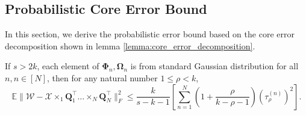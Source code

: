 \subsection{Probabilistic Core Error Bound}
In this section, we derive the probabilistic error bound based on the core error decomposition shown in lemma \ref{lemma:core_error_decomposition}. 
\begin{lem}
\label{lemma:err_core_sketch}
If $s>2k$, each element of $\mathbf{\Phi}_n, \mathbf{\Omega}_n$ is from standard Gaussian distribution for all $n, n\in [N]$, then for any natural number $1\le \rho<k$, 
\begin{equation}
\mathbb{E} \|\mathscr{W} - \mathscr{X}\times_1 \mathbf{Q}_1^\top \dots \times_N \mathbf{Q}_N^\top\|_F^2 \le \frac{k}{s-k-1} \left[ \sum_{n=1}^N \left(1+\frac{\rho}{k-\rho-1}\right)(\tau^{(n)}_\rho)^2\right].
\end{equation}
\end{lem}
